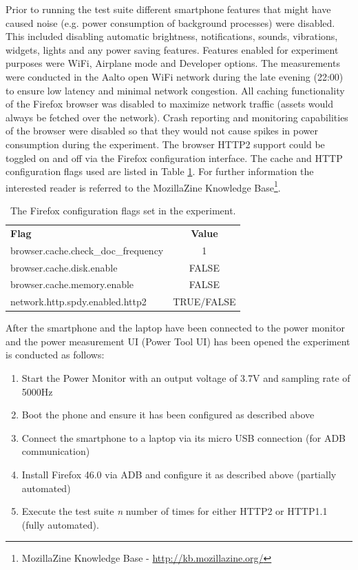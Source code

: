 \documentclass{article}
\begin{document}
Prior to running the test suite different smartphone features that might have caused noise (e.g. power consumption of background processes) were disabled. This included disabling automatic brightness, notifications, sounds, vibrations, widgets, lights and any power saving features. Features enabled for experiment purposes were WiFi, Airplane mode and Developer options. The measurements were conducted in the Aalto open WiFi network during the late evening (22:00) to ensure low latency and minimal network congestion. All caching functionality of the Firefox browser was disabled to maximize network traffic (assets would always be fetched over the network). Crash reporting and monitoring capabilities of the browser were disabled so that they would not cause spikes in power consumption during the experiment. The browser HTTP2 support could be toggled on and off via the Firefox configuration interface. The cache and HTTP configuration flags used are listed in Table \ref{table:firefox_flags}. For further information the interested reader is referred to the MozillaZine Knowledge Base\footnote{MozillaZine Knowledge Base - \url{http://kb.mozillazine.org/}}.

\clearpage

\begin{table}[]
    \centering
    \begin{tabular}{l|c|}
        \textbf{Flag} & \textbf{Value} \\
        browser.cache.check\_doc\_frequency & 1 \\
        browser.cache.disk.enable           & FALSE \\
        browser.cache.memory.enable         & FALSE \\
        network.http.spdy.enabled.http2     & TRUE/FALSE
    \end{tabular}
    \caption{The Firefox configuration flags set in the experiment.}
    \label{table:firefox_flags}
\end{table}

After the smartphone and the laptop have been connected to the power monitor and the power measurement UI (Power Tool UI) has been opened the experiment is conducted as follows:

\begin{enumerate}
    \item Start the Power Monitor with an output voltage of 3.7V and sampling rate of 5000Hz
    \item Boot the phone and ensure it has been configured as described above
    \item Connect the smartphone to a laptop via its micro USB connection (for ADB communication)
    \item Install Firefox 46.0 via ADB and configure it as described above (partially automated)
    \item Execute the test suite \emph{n} number of times for either HTTP2 or HTTP1.1 (fully automated).
\end{enumerate}
\end{document}
